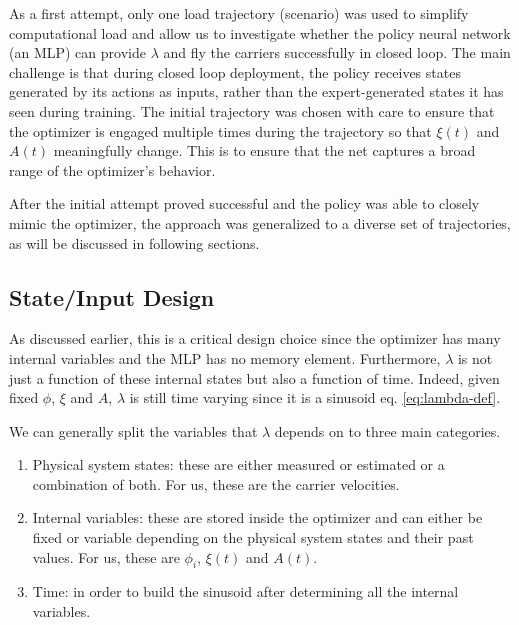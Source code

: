 As a first attempt, only one load trajectory (scenario) was used to simplify
computational load and allow us to investigate whether the policy
neural network (an MLP) can provide $\lambda$ and fly the carriers
successfully in closed loop. The main challenge is that during closed loop
deployment, the policy receives states generated by its actions as inputs, 
rather than the expert-generated states it has seen during
training. The initial 
trajectory was chosen with care to ensure that the optimizer is engaged
multiple times during the trajectory so that $\xi(t)$ and $A(t)$
meaningfully change. This is to ensure that the net captures a broad
range of the optimizer’s behavior.


After the initial attempt proved successful and the policy was able to
closely mimic the optimizer, the approach was generalized to a diverse
set of trajectories, as will be discussed in following sections.

\subsection{State/Input Design}

As discussed earlier, this is a critical design choice since the
optimizer has many internal variables and the MLP has no memory element.
Furthermore, $\lambda$ is not just a function of these internal states
but also a function of time. Indeed, given fixed $\phi$, $\xi$ and $A$,
$\lambda$ is still time varying since it is a sinusoid eq.
\eqref{eq:lambda-def}.

We can generally split the variables that $\lambda$ depends on to three
main categories.

\begin{enumerate}
  \item Physical system states: these are either measured or estimated
  or a combination of both. For us, these are the carrier velocities.
  \item Internal variables: these are stored inside the optimizer and
  can either be fixed or variable depending on the physical system
  states and their past values. For us, these are $\phi_i$, $\xi(t)$ and
  $A(t)$.
  \item Time: in order to build the sinusoid after determining all the
  internal variables.
\end{enumerate}

